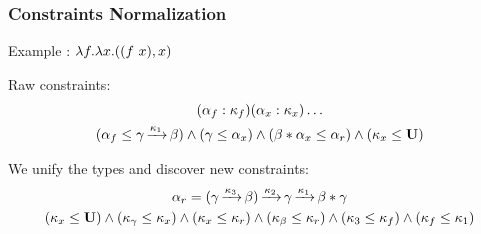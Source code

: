 \documentclass[xcolor=svgnames,11pt]{beamer}
\begin{document}
\begin{frame}
  \frametitle{Constraints \hfill Normalization}

  Example : $\lambda f . \lambda x . ((f\ x),x)$

  Raw constraints:
  \begin{gather*}
    (\alpha_f : \kappa_f)
    (\alpha_x : \kappa_x)\dots\\
    (\alpha_f \leq \gamma \operatorname{\xrightarrow{\kappa_1}} \beta )
    \wedge
    (\gamma \leq \alpha_x)
    \wedge
    (\beta * \alpha_x \leq \alpha_r)
    \wedge
    (\kappa_x \leq \mathbf{U})
  \end{gather*}\pause

  We unify the types and discover new constraints:
  \begin{gather*}
    \alpha_r =
    (\gamma \operatorname{\xrightarrow{\kappa_3}} \beta) \operatorname{\xrightarrow{\kappa_2}} \gamma \operatorname{\xrightarrow{\kappa_1}} \beta * \gamma\\
    (\kappa_x \leq \mathbf{U})
    \wedge
    (\kappa_\gamma \leq \kappa_x)
    \wedge
    (\kappa_x \leq \kappa_r)
    \wedge
    (\kappa_\beta \leq \kappa_r)
    \wedge
    (\kappa_3 \leq \kappa_f)
    \wedge
    (\kappa_f \leq \kappa_1)
  \end{gather*}
\end{frame}
\end{document}
